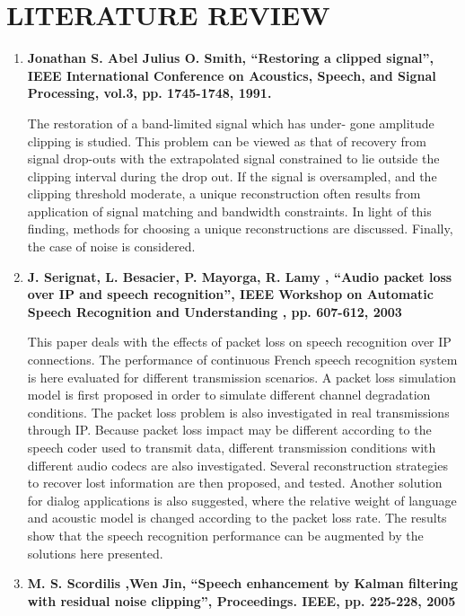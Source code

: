 \documentclass[a4paper,12pt]{report} %
\begin{document}
\chapter{LITERATURE REVIEW}
\begin{enumerate}[listparindent=10mm]
\item \textbf{Jonathan S. Abel Julius O. Smith, “Restoring a clipped signal”, IEEE International Conference on Acoustics, Speech, and Signal Processing, vol.3, pp. 1745-1748, 1991.}

The restoration of a band-limited signal which has under- gone amplitude clipping is studied. This problem can be viewed as that of recovery from signal drop-outs with the extrapolated signal constrained to lie outside the clipping interval during the drop out. If the signal is oversampled, and the clipping threshold moderate, a unique reconstruction often results from application of signal matching and bandwidth constraints. In light of this finding, methods for choosing a unique reconstructions are discussed. Finally, the case of noise is considered.

\item \textbf{J. Serignat, L. Besacier, P. Mayorga, R. Lamy , “Audio packet loss over IP and speech recognition”, IEEE Workshop on Automatic Speech Recognition and Understanding , pp. 607-612, 2003}

This paper deals with the effects of packet loss on speech recognition over IP connections. The performance of  continuous French speech recognition system is here evaluated for different transmission scenarios. A packet loss simulation model is first proposed in order to simulate different channel degradation conditions. The packet loss problem is also investigated in real transmissions through IP. Because packet loss impact may be different according to the speech coder used to transmit data, different transmission conditions with different audio codecs are also investigated. Several reconstruction strategies to recover lost information are then proposed, and tested. Another solution for dialog applications is also suggested, where the relative weight of language and acoustic model is changed according to the packet loss rate. The results show that the speech recognition performance can be augmented by the solutions here presented.

\item \textbf{M. S. Scordilis ,Wen Jin, “Speech enhancement by Kalman filtering with residual noise clipping”, Proceedings. IEEE, pp. 225-228, 2005}


\end{enumerate}
\end{document}
